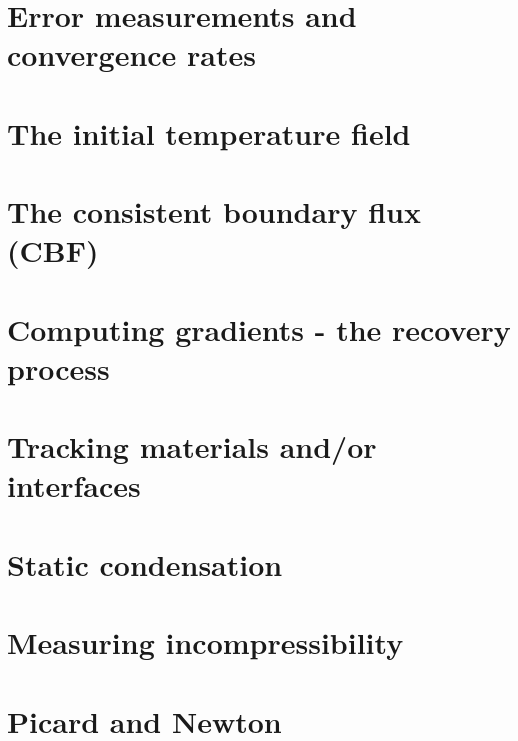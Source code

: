 \section{Error measurements and convergence rates}  %
\newpage %
\section{The initial temperature field}  %
\newpage %
\section{The consistent boundary flux (CBF) \label{ss:cbf}}  %
\newpage %
\section{Computing gradients - the recovery process \label{ss:gradrecovery}}  %
\newpage %
\section{Tracking materials and/or interfaces}  %
\newpage %
\section{Static condensation}  %
\newpage %
\section{Measuring incompressibility \label{ss_incomp}}  %
\newpage %
\section{Picard and Newton \label{ss_nonlinear}}  %
\newpage %

